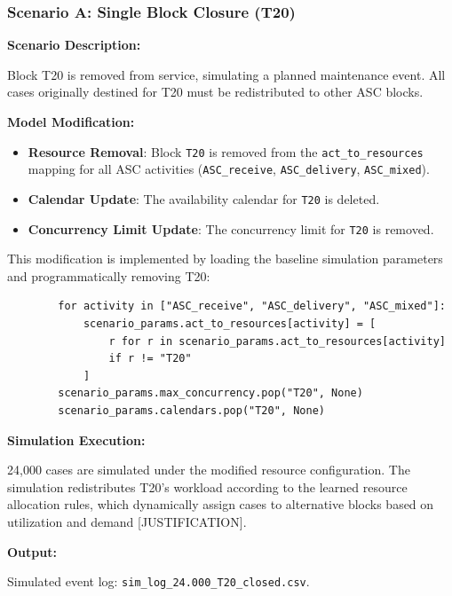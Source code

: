         \subsubsection{Scenario A: Single Block Closure (T20)}
        
        \textbf{Scenario Description:}
        
        Block T20 is removed from service, simulating a planned maintenance event. All cases originally destined for T20 must be redistributed to other ASC blocks.
        
        \textbf{Model Modification:}
        
        \begin{itemize}
            \item \textbf{Resource Removal}: Block \texttt{T20} is removed from the \texttt{act\_to\_resources} mapping for all ASC activities (\texttt{ASC\_receive}, \texttt{ASC\_delivery}, \texttt{ASC\_mixed}).
            \item \textbf{Calendar Update}: The availability calendar for \texttt{T20} is deleted.
            \item \textbf{Concurrency Limit Update}: The concurrency limit for \texttt{T20} is removed.
        \end{itemize}
        
        This modification is implemented by loading the baseline simulation parameters and programmatically removing T20:
        
        \begin{verbatim}
        for activity in ["ASC_receive", "ASC_delivery", "ASC_mixed"]:
            scenario_params.act_to_resources[activity] = [
                r for r in scenario_params.act_to_resources[activity]
                if r != "T20"
            ]
        scenario_params.max_concurrency.pop("T20", None)
        scenario_params.calendars.pop("T20", None)
        \end{verbatim}
        
        \textbf{Simulation Execution:}
        
        24,000 cases are simulated under the modified resource configuration. The simulation redistributes T20's workload according to the learned resource allocation rules, which dynamically assign cases to alternative blocks based on utilization and demand [JUSTIFICATION].
        
        \textbf{Output:}
        
        Simulated event log: \texttt{sim\_log\_24.000\_T20\_closed.csv}.

